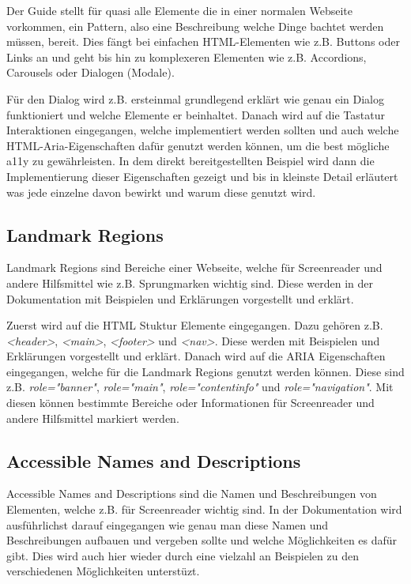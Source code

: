 Der Guide stellt für quasi alle Elemente die in einer normalen Webseite vorkommen, ein Pattern, also eine Beschreibung welche Dinge bachtet werden müssen, bereit. Dies fängt bei einfachen HTML-Elementen wie z.B. Buttons oder Links an und geht bis hin zu komplexeren Elementen wie z.B. Accordions, Carousels oder Dialogen (Modale). \cite{initiative_wai_patterns_nodate}

Für den Dialog wird z.B. ersteinmal grundlegend erklärt wie genau ein Dialog funktioniert und welche Elemente er beinhaltet. Danach wird auf die Tastatur Interaktionen eingegangen, welche implementiert werden sollten und auch welche HTML-Aria-Eigenschaften dafür genutzt werden können, um die best mögliche a11y zu gewährleisten. In dem direkt bereitgestellten Beispiel wird dann die Implementierung dieser Eigenschaften gezeigt und bis in kleinste Detail erläutert was jede einzelne davon bewirkt und warum diese genutzt wird.

\subsection{Landmark Regions}

Landmark Regions sind Bereiche einer Webseite, welche für Screenreader und andere Hilfsmittel wie z.B. Sprungmarken wichtig sind. \cite{initiative_wai_landmark_nodate} Diese werden in der Dokumentation mit Beispielen und Erklärungen vorgestellt und erklärt.

Zuerst wird auf die HTML Stuktur Elemente eingegangen. Dazu gehören z.B. \emph{<header>}, \emph{<main>}, \emph{<footer>} und \emph{<nav>}. Diese werden mit Beispielen und Erklärungen vorgestellt und erklärt. Danach wird auf die ARIA Eigenschaften eingegangen, welche für die Landmark Regions genutzt werden können. Diese sind z.B. \emph{role="banner"}, \emph{role="main"}, \emph{role="contentinfo"} und \emph{role="navigation"}. Mit diesen können bestimmte Bereiche oder Informationen für Screenreader und andere Hilfsmittel markiert werden.

\subsection{Accessible Names and Descriptions}

Accessible Names and Descriptions sind die Namen und Beschreibungen von Elementen, welche z.B. für Screenreader wichtig sind. \cite{initiative_wai_providing_nodate} In der Dokumentation wird ausführlichst darauf eingegangen wie genau man diese Namen und Beschreibungen aufbauen und vergeben sollte und welche Möglichkeiten es dafür gibt. Dies wird auch hier wieder durch eine vielzahl an Beispielen zu den verschiedenen Möglichkeiten unterstüzt.

